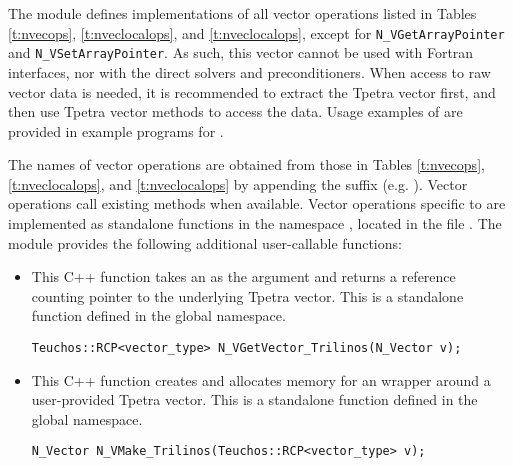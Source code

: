 The {\nvectrilinos} module defines implementations of all vector operations listed
in Tables \ref{t:nvecops}, \ref{t:nveclocalops}, and
\ref{t:nveclocalops}, except for \verb|N_VGetArrayPointer| and
\verb|N_VSetArrayPointer|. As such, this vector cannot be used with
{\sundials} Fortran interfaces, nor with the {\sundials} direct
solvers and preconditioners. When access to raw vector data is needed, it is
recommended to extract the {\trilinos} Tpetra vector first, and then use Tpetra vector
methods to access the data. Usage examples of {\nvectrilinos} are provided in
example programs for {\ida} \cite{ida_ex}.

The names of vector operations are obtained from those in
Tables \ref{t:nvecops}, \ref{t:nveclocalops}, and \ref{t:nveclocalops} by appending the
suffix  (e.g. ).
Vector operations call existing  methods when available. Vector
operations specific to {\sundials} are implemented as standalone functions in the namespace
, located in the file .
The module {\nvectrilinos} provides the following additional user-callable functions:
\begin{itemize}



\item {}

  This C++ function takes an  as the argument and returns a reference
  counting pointer to the underlying Tpetra vector. This is a standalone function
  defined in the global namespace.

\begin{verbatim}
Teuchos::RCP<vector_type> N_VGetVector_Trilinos(N_Vector v);
\end{verbatim}



\item {}

  This C++ function creates and allocates memory for an {\nvectrilinos}
  wrapper around a user-provided Tpetra vector. This is a standalone function
  defined in the global namespace.

\begin{verbatim}
N_Vector N_VMake_Trilinos(Teuchos::RCP<vector_type> v);
\end{verbatim}


\end{itemize}
